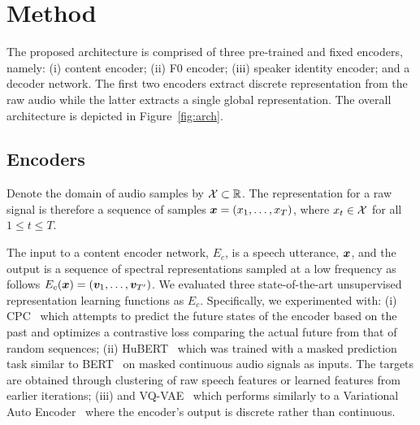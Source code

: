 \vspace{-0.1cm}
\section{Method}
\vspace{-0.1cm}
\label{sec:method}
The proposed architecture is comprised of three pre-trained and fixed encoders, namely: (i) content encoder; (ii) F0 encoder; (iii) speaker identity encoder; and a decoder network. The first two encoders extract discrete representation from the raw audio while the latter extracts a single global representation. The overall architecture is depicted in Figure~\ref{fig:arch}. 

\vspace{-0.2cm}
\subsection{Encoders}
\vspace{-0.1cm}
Denote the domain of audio samples by $\mathcal{X} \subset \mathbb{R}$. The representation for a raw signal is therefore a sequence of samples $\bm{x} = (x_1,\ldots, x_T)$, where  $x_t\in\mathcal{X}$ for all $1\leq t \leq T$. 

The input to a content encoder network, $E_c$, is a speech utterance, $\bm{x}$, and the output is 
a sequence of spectral representations sampled at a low frequency as follows $E_c(\bm{x}) = (\bm{v}_1, \dots, \bm{v}_{T'})$. We evaluated three state-of-the-art unsupervised representation learning functions as $E_c$. Specifically, we experimented with: (i) CPC~\cite{oord2018representation} which attempts to predict the future states of the encoder based on the past and optimizes a contrastive loss comparing the actual future from that of random sequences; (ii) HuBERT~\cite{hsu2020hubert} which was trained with a masked prediction task similar to BERT~\cite{devlin-etal-2019-bert} on masked continuous audio signals as inputs. The targets are obtained through clustering of raw speech features or learned features from earlier iterations; (iii) and VQ-VAE~\cite{van2017neural} which performs similarly to a Variational Auto Encoder~\cite{kingma2013auto} where the encoder's output is discrete rather than continuous. 

